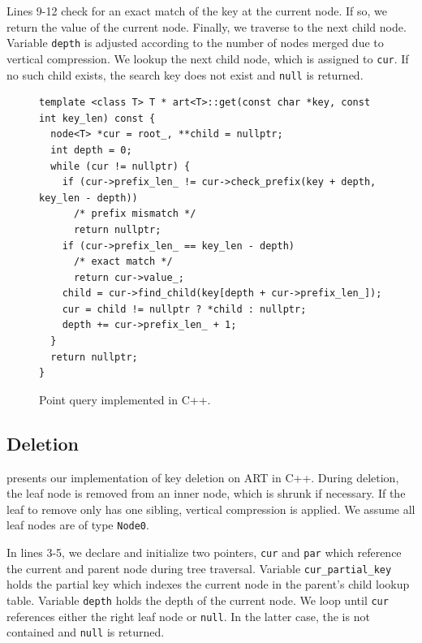 \documentclass[abstracton,12pt]{scrartcl}
\theoremstyle{definition}
\begin{document}
Lines 9-12 check for an exact match of the key at the current node. If so,
we return the value of the current node. Finally, we traverse to the next child
node. Variable \texttt{depth} is adjusted according to the number of nodes 
merged due to vertical compression. We lookup the next child node, which is 
assigned to \texttt{cur}. If no such child exists, the search key does not 
exist and \texttt{null} is returned.

\vspace{-2mm}

\begin{figure}[H]
  \begin{verbatim}
template <class T> T * art<T>::get(const char *key, const int key_len) const {
  node<T> *cur = root_, **child = nullptr;
  int depth = 0;
  while (cur != nullptr) {
    if (cur->prefix_len_ != cur->check_prefix(key + depth, key_len - depth))
      /* prefix mismatch */
      return nullptr;
    if (cur->prefix_len_ == key_len - depth)
      /* exact match */
      return cur->value_;
    child = cur->find_child(key[depth + cur->prefix_len_]);
    cur = child != nullptr ? *child : nullptr;
    depth += cur->prefix_len_ + 1;
  }
  return nullptr;
}
  \end{verbatim}
  \vspace{-6mm}
  \caption{Point query implemented in C++.}
  \label{algo:point-query}
  \vspace{-7mm}
\end{figure}

\newpage

\subsection{Deletion}\label{sec:deletion}

 presents our implementation of key deletion on ART in C++.
During deletion, the leaf node is removed from an inner node, which is shrunk
if necessary. If the leaf to remove only has one sibling, vertical
compression is applied. We assume all leaf nodes are of type \texttt{Node0}.

In lines 3-5, we declare and initialize two pointers, \texttt{cur} and
\texttt{par} which reference the current and parent node during tree traversal.
Variable \texttt{cur\_partial\_key} holds the partial key which indexes the
current node in the parent's child lookup table.
Variable \texttt{depth} holds the depth of the current node.
We loop until \texttt{cur} references either the right leaf node or
\texttt{null}. In the latter case, the is not contained and \texttt{null} is 
returned.
\end{document}
